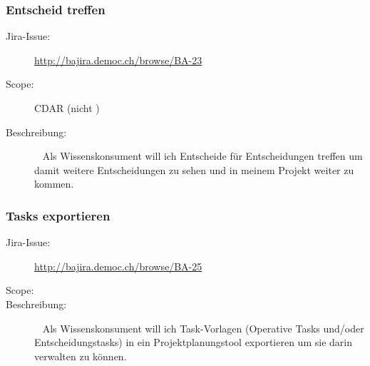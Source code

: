 	\subsubsection{Entscheid treffen}
		\begin{description}
			\item[Jira-Issue:] \url{http://bajira.democ.ch/browse/BA-23}
			\item[Scope:] CDAR (nicht \eeppi)
			\item[Beschreibung:]\ \newline
				Als Wissenskonsument\newline
				will ich Entscheide für Entscheidungen treffen\newline
				um damit weitere Entscheidungen zu sehen und in meinem Projekt weiter zu kommen.
		\end{description}

	\subsubsection{Tasks exportieren}
		\begin{description}
			\item[Jira-Issue:] \url{http://bajira.democ.ch/browse/BA-25}
			\item[Scope:] \eeppi
			\item[Beschreibung:]\ \newline
				Als Wissenskonsument\newline
				will ich Task-Vorlagen (Operative Tasks und/oder Entscheidungstasks) in ein Projektplanungstool exportieren\newline
				um sie darin verwalten zu können.
		\end{description}

	
